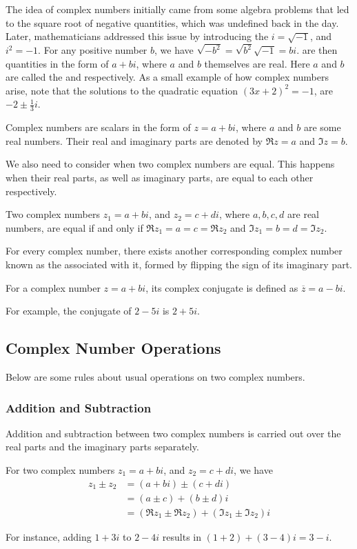 The idea of complex numbers initially came from some algebra problems that led to the square root of negative quantities, which was undefined back in the day. Later, mathematicians addressed this issue by introducing the  $i = \sqrt{-1}$, and $i^2 = -1$. For any positive number $b$, we have $\sqrt{-b^2} = \sqrt{b^2}\sqrt{-1} = bi$.  are then quantities in the form of $a + bi$, where $a$ and $b$ themselves are real. Here $a$ and $b$ are called the  and  respectively. As a small example of how complex numbers arise, note that the solutions to the quadratic equation $(3x+2)^2 = -1$, are $-2 \pm \frac{1}{3}i$.
\begin{defn}
Complex numbers are scalars in the form of $z = a + bi$, where $a$ and $b$ are some real numbers. Their real and imaginary parts are denoted by $\Re{z} = a$ and $\Im{z} = b$.
\end{defn}
We also need to consider when two complex numbers are equal. This happens when their real parts, as well as imaginary parts, are equal to each other respectively.
\begin{proper}
Two complex numbers $z_1 = a + bi$, and $z_2 = c + di$, where $a, b, c, d$ are real numbers, are equal if and only if $\Re{z_1} = a = c = \Re{z_2}$ and $\Im{z_1} = b = d = \Im{z_2}$.
\end{proper}
For every complex number, there exists another corresponding complex number known as the  associated with it, formed by flipping the sign of its imaginary part.
\begin{defn}
For a complex number $z = a + bi$, its complex conjugate is defined as $\overline{z} = a - bi$.
\end{defn}
For example, the conjugate of $2-5i$ is $2+5i$.

\subsection{Complex Number Operations}
Below are some rules about usual operations on two complex numbers.
\subsubsection{Addition and Subtraction}
Addition and subtraction between two complex numbers is carried out over the real parts and the imaginary parts separately.
\begin{defn}
For two complex numbers $z_1 = a + bi$, and $z_2 = c + di$, we have
\begin{align}
z_1 \pm z_2 &= (a + bi) \pm (c + di) \nonumber \\
&= (a \pm c) + (b \pm d)i \nonumber \\
&= (\Re{z_1} \pm \Re{z_2}) + (\Im{z_1} \pm \Im{z_2})i    
\end{align}
\end{defn}
For instance, adding $1 + 3i$ to $2 - 4i$ results in $(1+2) + (3-4)i = 3 - i$.

